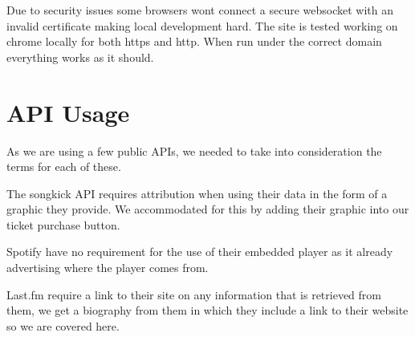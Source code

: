 \documentclass[10pt]{article}
\begin{document}
        Due to security issues some browsers wont connect a secure websocket with an invalid certificate making local development hard. The site is tested working on chrome locally for both https and http. When run under the correct domain everything works as it should.

    \section{API Usage}
        As we are using a few public APIs, we needed to take into consideration the terms for each of these.

        The songkick API requires attribution when using their data in the form of a graphic they provide. We accommodated for this by adding their graphic into our ticket purchase button.

        Spotify have no requirement for the use of their embedded player as it already advertising where the player comes from.

        Last.fm require a link to their site on any information that is retrieved from them, we get a biography from them in which they include a link to their website so we are covered here.
\end{document}
